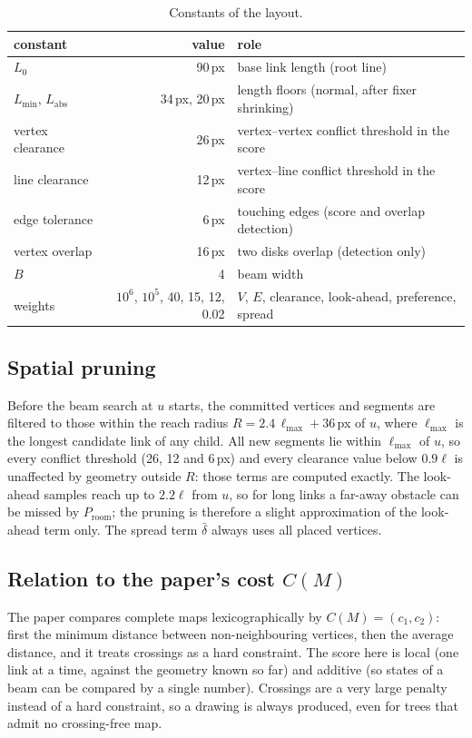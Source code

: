 \documentclass[11pt,a4paper]{article}
\newcommand{\len}{\ell}
\begin{document}
\begin{table}[ht]
\centering\small
\begin{tabular}{@{}l r l@{}}
\toprule
constant & value & role\\
\midrule
$L_0$ & 90\,px & base link length (root line)\\
$L_{\min}$, $L_{\text{abs}}$ & 34\,px, 20\,px & length floors (normal, after fixer shrinking)\\
vertex clearance & 26\,px & vertex--vertex conflict threshold in the score\\
line clearance & 12\,px & vertex--line conflict threshold in the score\\
edge tolerance & 6\,px & touching edges (score and overlap detection)\\
vertex overlap & 16\,px & two disks overlap (detection only)\\
$B$ & 4 & beam width\\
weights & $10^6$, $10^5$, 40, 15, 12, 0.02 & $V$, $E$, clearance, look-ahead, preference, spread\\
\bottomrule
\end{tabular}
\caption{Constants of the layout.}
\label{tab:const}
\end{table}

\subsection{Spatial pruning}
\label{sec:prune}

Before the beam search at $u$ starts, the committed vertices and segments are filtered to those within the reach radius $R=2.4\,\len_{\max}+36$\,px of $u$, where $\len_{\max}$ is the longest candidate link of any child. All new segments lie within $\len_{\max}$ of $u$, so every conflict threshold (26, 12 and 6\,px) and every clearance value below $0.9\len$ is unaffected by geometry outside $R$: those terms are computed exactly. The look-ahead samples reach up to $2.2\len$ from $u$, so for long links a far-away obstacle can be missed by $P_{\text{room}}$; the pruning is therefore a slight approximation of the look-ahead term only. The spread term $\bar\delta$ always uses all placed vertices.

\subsection{Relation to the paper's cost $C(M)$}

The paper compares complete maps lexicographically by $C(M)=(c_1,c_2)$: first the minimum distance between non-neighbouring vertices, then the average distance, and it treats crossings as a hard constraint. The score here is local (one link at a time, against the geometry known so far) and additive (so states of a beam can be compared by a single number). Crossings are a very large penalty instead of a hard constraint, so a drawing is always produced, even for trees that admit no crossing-free map.
\end{document}
